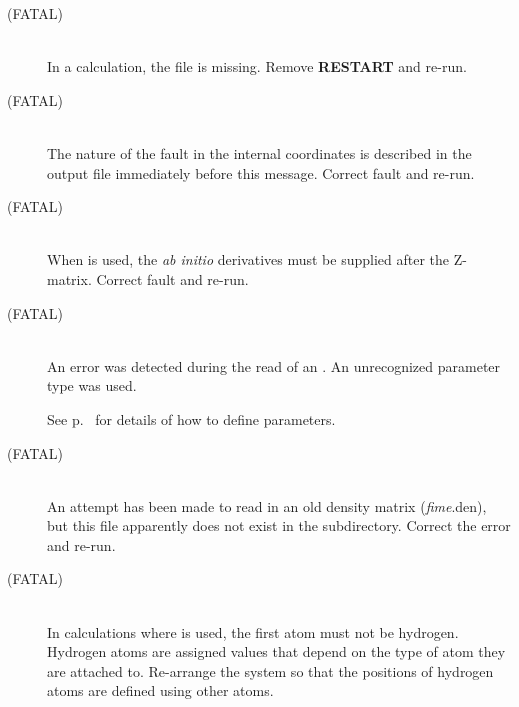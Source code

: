 \begin{description}
\item[ (FATAL)]~\\
In a  calculation, the  file is missing. Remove {\bf
RESTART} and re-run.


\item[ (FATAL)]~\\
The nature of the fault in the internal coordinates is described in the
output file immediately before this message.  Correct fault and re-run.

\item[ (FATAL)]~\\
When  is used, the {\em ab initio} derivatives must be supplied
after the Z-matrix.  Correct fault and re-run.

\item[ (FATAL)]~\\
An error was detected during the read of an . An unrecognized parameter type was used.

\begin{latexonly}
See p.~\pageref{external} for details of how to define parameters.
\end{latexonly}

\item[ (FATAL)]~\\
An attempt has been made to read in an old density matrix ({\em fime}.den), but
this file apparently does not exist in the subdirectory.  Correct the error and
re-run.

\item[ (FATAL)]~\\
In  calculations where  is used, the first atom must not be
hydrogen.  Hydrogen atoms are assigned values that depend on the type of atom
they are attached to.  Re-arrange the system so that the positions of hydrogen
atoms are defined using other atoms.



\end{description}
